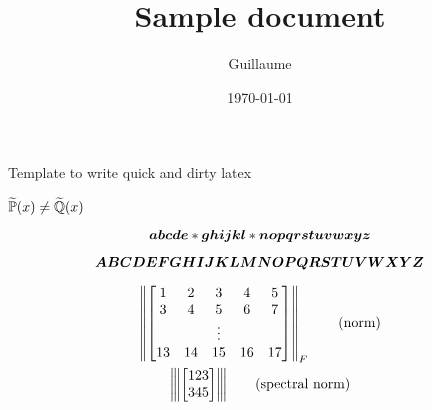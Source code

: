 \documentclass{article}
\title{Sample document}
\author{Guillaume}
\date{\today}
\begin{document}
\maketitle

Template to write quick and dirty latex

$\widetilde{\mathbb{P}}(x) \neq \widetilde{\mathbb{Q}}(x)$

\begin{equation}
\bm{a} \bm{b} \bm{c} \bm{d} \bm{e} * \bm{g} \bm{h} \bm{i} \bm{j} \bm{k} \bm{l} * \bm{n} \bm{o} \bm{p} \bm{q} \bm{r} \bm{s} \bm{t} \bm{u} \bm{v} \bm{w} \bm{x} \bm{y} \bm{z}
\end{equation}

\begin{equation}
\bm{A} \bm{B} \bm{C} \bm{D} \bm{E} \bm{F} \bm{G} \bm{H} \bm{I} \bm{J} \bm{K} \bm{L} \bm{M} \bm{N} \bm{O} \bm{P} \bm{Q} \bm{R} \bm{S} \bm{T} \bm{U} \bm{V} \bm{W} \bm{X} \bm{Y} \bm{Z}
\end{equation}


\begin{gather}
    \left\lVert 
    \begin{bmatrix}
        1 & 2 & 3 & 4 & 5 \\
        3 & 4 & 5 & 6 & 7 \\
        && \vdots && \\
        13 & 14 & 15 & 16 & 17 \\
    \end{bmatrix}
     \right\rVert_F \label{eq:norm} \tag{norm} \\
    {\left\vert\kern-0.25ex\left\vert\kern-0.25ex\left\vert 
    \begin{bmatrix}
        1 2 3 \\
        3 4 5
    \end{bmatrix}
     \right\vert\kern-0.25ex\right\vert\kern-0.25ex\right\vert} \label{eq:spnorm} \tag{spectral norm}
\end{gather}
\end{document}

